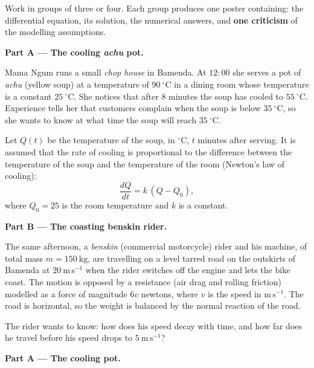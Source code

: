 \documentclass[11pt]{article}
\newcommand{\cle}[1]{{\popxbold\color{popdark}#1}}
\newcounter{popsec}
\newcounter{popsub}
\newcommand{\courssub}[1]{%
  \stepcounter{popsub}%
  \par\vspace{9pt}\noindent{\popxbold\fontsize{11.5}{13}\selectfont\color{popink}{\color{poporange}\thepopsec.\thepopsub}\hspace{6pt}#1}\par\nopagebreak\vspace{4pt}
}
\begin{document}
Work in groups of three or four. Each group produces one poster containing: the differential equation, its solution, the numerical answers, and \textbf{one criticism} of the modelling assumptions.

\courssub{Situation}

\textbf{Part A — The cooling \emph{achu} pot.}

Mama Ngum runs a small \emph{chop house} in Bamenda. At $12{:}00$ she serves a pot of \emph{achu} (yellow soup) at a temperature of $90\ ^\circ\mathrm{C}$ in a dining room whose temperature is a constant $25\ ^\circ\mathrm{C}$. She notices that after $8$ minutes the soup has cooled to $55\ ^\circ\mathrm{C}$. Experience tells her that customers complain when the soup is below $35\ ^\circ\mathrm{C}$, so she wants to know at what time the soup will reach $35\ ^\circ\mathrm{C}$.

Let $Q(t)$ be the temperature of the soup, in $^\circ\mathrm{C}$, $t$ minutes after serving. It is assumed that the rate of cooling is proportional to the difference between the temperature of the soup and the temperature of the room (\cle{Newton's law of cooling}):
\[
\frac{dQ}{dt}=k\,(Q-Q_0),
\]
where $Q_0=25$ is the room temperature and $k$ is a constant.

\textbf{Part B — The coasting benskin rider.}

The same afternoon, a \emph{benskin} (commercial motorcycle) rider and his machine, of total mass $m=150\ \mathrm{kg}$, are travelling on a level tarred road on the outskirts of Bamenda at $20\ \mathrm{m\,s^{-1}}$ when the rider switches off the engine and lets the bike coast. The motion is opposed by a resistance (air drag and rolling friction) modelled as a force of magnitude $6v$ newtons, where $v$ is the speed in $\mathrm{m\,s^{-1}}$. The road is horizontal, so the weight is balanced by the normal reaction of the road.

The rider wants to know: how does his speed decay with time, and how far does he travel before his speed drops to $5\ \mathrm{m\,s^{-1}}$?

\courssub{Tasks}

\textbf{Part A — The cooling pot.}
\end{document}
